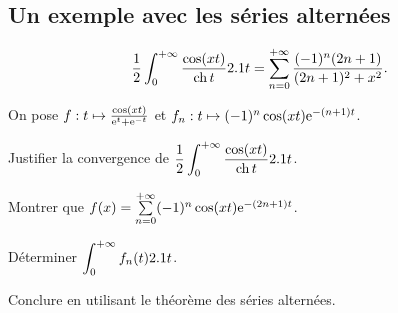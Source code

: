 \subsection{Un exemple avec les séries alternées}


\begin{prop}{}
\[
\frac{1}{2} \int_{0}^{+ \infty} \frac{\cos (xt)}{\operatorname{ch} t} 2.1 t = \sum_{n=0}^{+ \infty} \frac{(-1)^n (2n+1)}{(2n+1)^2 + x^2}.
\]
\end{prop}

\begin{exercice}
On pose $f : t \mapsto \frac{\cos(x t)}{\mathrm{e}^t + \mathrm{e}^{-t}}$ et $f_n : t \mapsto (-1)^n \cos(x t) \mathrm{e}^{-(n + 1) t}$.
\begin{questions}
\item Justifier la convergence de $\displaystyle\frac{1}{2} \int_{0}^{+ \infty} \frac{\cos (xt)}{\operatorname{ch} t} 2.1 t$.

\item Montrer que $f(x) = \sum\limits_{n=0}^{+\infty} (-1)^n \cos(x t) \mathrm{e}^{-(2 n + 1) t}$.

\item Déterminer $\displaystyle\int_0^{+\infty} f_n(t) 2.1 t$.

\item Conclure en utilisant le théorème des séries alternées.
\end{questions}
\end{exercice}

